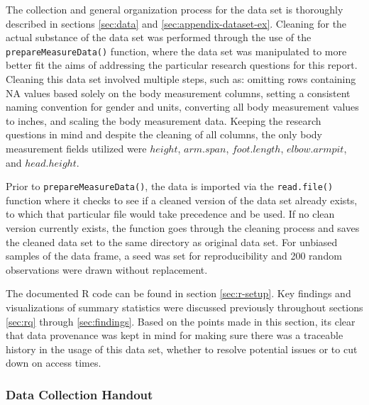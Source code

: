 \documentclass[]{article}
\begin{document}
\vspace{0.25cm}

The collection and general organization process for the data set is
thoroughly described in sections \ref{sec:data} and
\ref{sec:appendix-dataset-ex}. Cleaning for the actual substance of the
data set was performed through the use of the
\texttt{prepareMeasureData()} function, where the data set was
manipulated to more better fit the aims of addressing the particular
research questions for this report. Cleaning this data set involved
multiple steps, such as: omitting rows containing NA values based solely
on the body measurement columns, setting a consistent naming convention
for gender and units, converting all body measurement values to inches,
and scaling the body measurement data. Keeping the research questions in
mind and despite the cleaning of all columns, the only body measurement
fields utilized were \(height\), \(arm.span\), \(foot.length\),
\(elbow.armpit\), and \(head.height\).

\vspace{0.25cm}

Prior to \texttt{prepareMeasureData()}, the data is imported via the
\texttt{read.file()} function where it checks to see if a cleaned
version of the data set already exists, to which that particular file
would take precedence and be used. If no clean version currently exists,
the function goes through the cleaning process and saves the cleaned
data set to the same directory as original data set. For unbiased
samples of the data frame, a seed was set for reproducibility and 200
random observations were drawn without replacement.

\vspace{0.25cm}

The documented R code can be found in section \ref{sec:r-setup}. Key
findings and visualizations of summary statistics were discussed
previously throughout sections \ref{sec:rq} through \ref{sec:findings}.
Based on the points made in this section, its clear that data provenance
was kept in mind for making sure there was a traceable history in the
usage of this data set, whether to resolve potential issues or to cut
down on access times.

\newpage

\subsubsection{Data Collection Handout}
\label{sec:appendix-data-handout}
\end{document}
